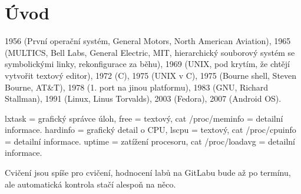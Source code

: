 \documentclass[12pt]{article}                   %
\begin{document}
\section{Úvod}
    \begin{poznamka}[Historie]
        1956 (První operační systém, General Motors, North American Aviation), 1965 (MULTICS, Bell Labs, General Electric, MIT, hierarchický souborový systém se symbolickými linky, rekonfigurace za běhu), 1969 (UNIX, pod krytím, že chtějí vytvořit textový editor), 1972 (C), 1975 (UNIX v C), 1975 (Bourne shell, Steven Bourne, AT\&T), 1978 (1. port na jinou platformu), 1983 (GNU, Richard Stallman), 1991 (Linux, Linus Torvalds), 2003 (Fedora), 2007 (Android OS).
    \end{poznamka}

    \begin{poznamka}[Motivace]
        lxtask = grafický správce úloh, free = textový, cat /proc/meminfo = detailní informace. hardinfo = grafický detail o CPU, lscpu = textový, cat /proc/cpuinfo = detailní informace. uptime = zatížení procesoru, cat /proc/loadavg = detailní informace.
    \end{poznamka}

    \begin{poznamka}[Labs]
        Cvičení jsou spíše pro cvičení, hodnocení labů na GitLabu bude až po termínu, ale automatická kontrola stačí alespoň na něco.
    \end{poznamka}
\end{document}
